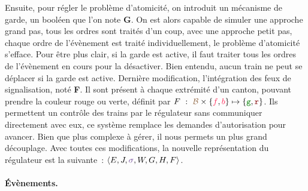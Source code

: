 \documentclass[oneside, a4paper, 11pt]{book}
\newcommand{\dirFmt}[1]{{\color{dircolor} #1}}
\newcommand{\posFmt}[1]{{\color{poscolor}{#1}}}
\newcommand{\swFmt}[1]{{\color{swcolor}{#1}}}
\newcommand{\sigred}{{\mbox{${\color{red!50!black}\mathtt{r}}$}}}
\newcommand{\siggreen}{{\mbox{${\color{green!50!black}\mathtt{g}}$}}}
\newcommand{\regM}[7]{\langle #1, #2, #3, #4, #5, #6, #7 \rangle}
\begin{document}
\noindent
Ensuite, pour régler le problème d'atomicité, on introduit un mécanisme de garde, un booléen que l'on note \textbf{G}. On est alors capable de simuler une approche grand pas, tous les ordres sont traités d'un coup, avec une approche petit pas, chaque ordre de l'évènement est traité individuellement, le problème d'atomicité s'efface.
Pour être plus clair, si la garde est active, il faut traiter tous les ordres de l'évènement en cours pour la désactiver. Bien entendu, aucun train ne peut se déplacer si la garde est active.
Dernière modification, l'intégration des feux de signalisation, noté \textbf{F}. Il sont présent à chaque extrémité d'un canton, pouvant prendre la couleur rouge ou verte, définit par $F~:~\posFmt{\mathcal{B}} \times \{\dirFmt{f},\dirFmt{b}\} \mapsto \{\siggreen, \sigred\}$. Ils permettent un contrôle des trains par le régulateur sans communiquer directement avec eux, ce système remplace les demandes d'autorisation pour avancer. Bien que plus complexe à gérer, il nous permets un plus grand découplage.
Avec toutes ces modifications, la nouvelle représentation du régulateur est la suivante~: $\regM{E}{J}{\swFmt{\sigma}}{W}{G}{H}{F}$.


\paragraph{Évènements.} 
\end{document}
